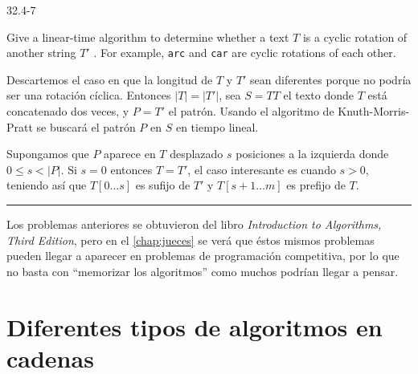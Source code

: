 \begin{tcolorbox}
\hypertarget{cyclic_rotation}{32.4-7}   
Give a linear-time algorithm to determine whether a text $T$ is a cyclic rotation of another string
$T'$ . For example, \texttt{arc} and \texttt{car} are cyclic rotations of each other.
\end{tcolorbox}

Descartemos el caso en que la longitud de $T$ y $T'$ sean diferentes porque no podría ser una
rotación cíclica. Entonces $\vert T \vert = \vert T' \vert$, sea $S = TT$ el texto donde $T$ está
concatenado dos veces, y $P = T'$ el patrón. Usando el algoritmo de Knuth-Morris-Pratt se buscará
el patrón $P$ en $S$ en tiempo lineal.

Supongamos que $P$ aparece en $T$ desplazado $s$ posiciones a la izquierda donde
$0 \leq s < \vert P \vert$. Si $s = 0$ entonces $T = T'$, el caso interesante es cuando $s > 0$,
teniendo así que $T[0 \ldots s]$ es sufijo de $T'$ y $T[s+1 \ldots m]$ es prefijo de $T$. 

\noindent\rule{\textwidth}{1pt}

Los problemas anteriores se obtuvieron del libro \textit{Introduction to Algorithms, Third
Edition}\cite{cormen_2009}, pero en el \autoref{chap:jueces} se verá que éstos mismos problemas
pueden llegar a aparecer en problemas de programación competitiva, por lo que no basta con
``memorizar los algoritmos'' como muchos podrían llegar a pensar.

\section{Diferentes tipos de algoritmos en cadenas}

